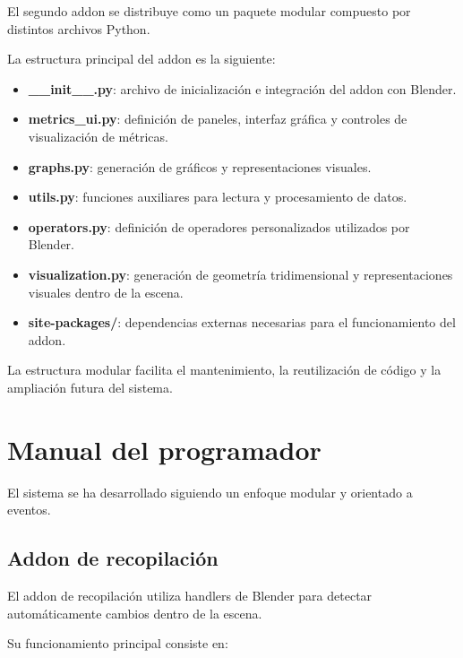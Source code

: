 El segundo addon se distribuye como un paquete modular compuesto por distintos archivos Python.

La estructura principal del addon es la siguiente:

\begin{itemize}

    \item \textbf{\_\_init\_\_.py}: archivo de inicialización e integración del addon con Blender.

    \item \textbf{metrics\_ui.py}: definición de paneles, interfaz gráfica y controles de visualización de métricas.

    \item \textbf{graphs.py}: generación de gráficos y representaciones visuales.

    \item \textbf{utils.py}: funciones auxiliares para lectura y procesamiento de datos.

    \item \textbf{operators.py}: definición de operadores personalizados utilizados por Blender.

    \item \textbf{visualization.py}: generación de geometría tridimensional y representaciones visuales dentro de la escena.

    \item \textbf{site-packages/}: dependencias externas necesarias para el funcionamiento del addon.

\end{itemize}

La estructura modular facilita el mantenimiento, la reutilización de código y la ampliación futura del sistema.

\section{Manual del programador}

El sistema se ha desarrollado siguiendo un enfoque modular y orientado a eventos.

\subsection{Addon de recopilación}

El addon de recopilación utiliza handlers de Blender para detectar automáticamente cambios dentro de la escena.

Su funcionamiento principal consiste en:

